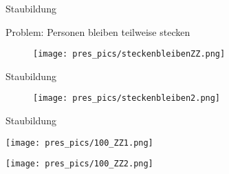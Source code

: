 \begin{frame}{Staubildung}

\centering
Problem: Personen bleiben teilweise stecken

	\begin{figure}
		\texttt{[image: pres\_pics/steckenbleibenZZ.png]}

	\end{figure}

\end{frame}


\begin{frame}{Staubildung}

	\begin{figure}
		\texttt{[image: pres\_pics/steckenbleiben2.png]}

	\end{figure}

\end{frame}



\begin{frame}{Staubildung}

	\begin{minipage}{0.50\textwidth}
		\texttt{[image: pres\_pics/100\_ZZ1.png]}

	\end{minipage} \hfill
	\begin{minipage}{0.48\textwidth}
		\texttt{[image: pres\_pics/100\_ZZ2.png]}

\end{minipage}

\end{frame}

